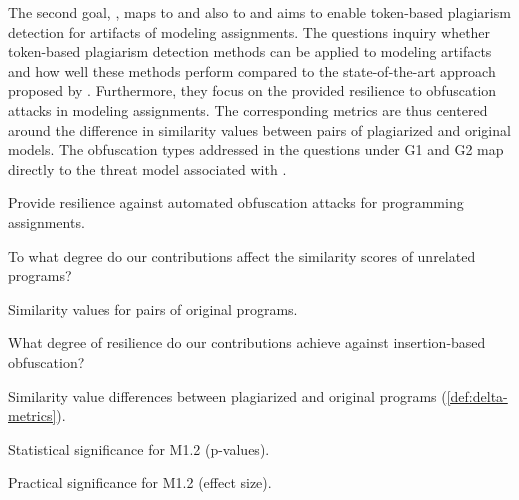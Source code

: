 The second goal, , maps to  and also to  and aims to enable token-based plagiarism detection for artifacts of modeling assignments. The questions inquiry whether token-based plagiarism detection methods can be applied to modeling artifacts and how well these methods perform compared to the state-of-the-art approach proposed by \citet{Martinez2020}. Furthermore, they focus on the provided resilience to obfuscation attacks in modeling assignments.
The corresponding metrics are thus centered around the difference in similarity values between pairs of plagiarized and original models.
%
The obfuscation types addressed in the questions under G1 and G2 map directly to the threat model associated with .

\clearpage
\begin{description}\label{main-gqm}
    \label{gqm-plan}
    \item[\large{Goal-Question-Metric Plan:}]
    \normalsize
    \item[G1] Provide resilience against automated obfuscation attacks for programming assignments.
        \begin{description}[style=unboxed]
            \footnotesize
            \item[Q1.1] To what degree do our contributions affect the similarity scores of unrelated programs?
                \begin{description}[style=unboxed]
                    \footnotesize
                    \item[M1.1] Similarity values for pairs of original programs.
                \end{description}
            \item[Q1.2] What degree of resilience do our contributions achieve against insertion-based obfuscation?
                \begin{description}[style=unboxed]
                    \footnotesize
                    \item[M1.2] Similarity value differences between plagiarized and original programs (\autoref{def:delta-metrics}).
                    \item[M1.3] Statistical significance for M1.2 (p-values).
                    \item[M1.4] Practical significance for M1.2 (effect size).
                \end{description}

\end{description}
\end{description}

